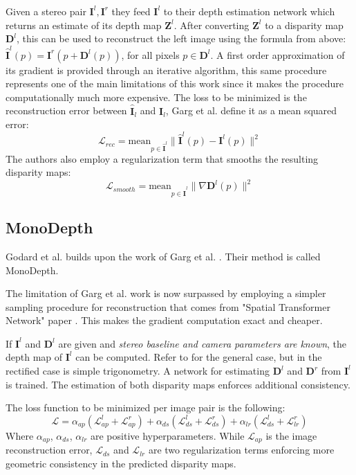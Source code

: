 Given a stereo pair $\mathbf{I}^{l}, \mathbf{I}^{r}$ they feed $\mathbf{I}^{l}$ to their depth estimation network which returns an estimate of its depth map $\mathbf{Z}^{l}$.
After converting $\mathbf{Z}^{l}$ to a disparity map $\mathbf{D}^{l}$, this can be used to reconstruct the left image using the formula from above: $\hat{\mathbf{I}}^{l} (p) = \mathbf{I}^{r} (p + \mathbf{D}^{l}(p))$, for all pixels $p \in \mathbf{D}^{l}$.
A first order approximation of its gradient is provided through an iterative algorithm, this same procedure represents one of the main limitations of this work since it makes the procedure computationally much more expensive.
The loss to be minimized is the reconstruction error between $\hat{\mathbf{I}}_{l}$ and $\mathbf{I}_{l}$, Garg et al. define it as a mean squared error:
\[
	\mathcal{L}_{rec} = \text{mean}_{p \in \hat{\mathbf{I}}^{l}} \big\| \hat{\mathbf{I}}^{l}(p) - \mathbf{I}^{l}(p) \big\|^{2}
\]
The authors also employ a regularization term that smooths the resulting disparity maps:
\[
	\mathcal{L}_{smooth} = \text{mean}_{p \in \hat{\mathbf{I}}^{l}} \big\| \nabla \mathbf{D}^{l} (p) \big\|^{2}
\]

\subsection{MonoDepth}
Godard et al. \cite{MonoDepth} builds upon the work of Garg et al. \cite{Garg}.
Their method is called MonoDepth.

The limitation of Garg et al. work is now surpassed by employing a simpler sampling procedure for reconstruction that comes from "Spatial Transformer Network" paper \cite{STN}.
This makes the gradient computation exact and cheaper.

If $\mathbf{I}^{l}$ and $\mathbf{D}^{l}$ are given and \textit{stereo baseline and camera parameters are known}, the depth map of $\mathbf{I}^{l}$ can be computed.
Refer to \cite{multiview} for the general case, but in the rectified case is simple trigonometry.
A network for estimating $\mathbf{D}^{l}$ and $\mathbf{D}^{r}$ from $\mathbf{I}^{l}$ is trained.
The estimation of both disparity maps enforces additional consistency.

The loss function to be minimized per image pair is the following:
\[
	\mathcal{L} = \alpha_{ap}(\mathcal{L}_{ap}^{l} + \mathcal{L}_{ap}^{r}) +
		\alpha_{ds}(\mathcal{L}_{ds}^{l} + \mathcal{L}_{ds}^{r}) +
		\alpha_{lr}(\mathcal{L}_{ds}^{l} + \mathcal{L}_{lr}^{r}) 
\]
Where $\alpha_{ap}$, $\alpha_{ds}$, $\alpha_{lr}$ are positive hyperparameters.
While $\mathcal{L}_{ap}$ is the image reconstruction error, $\mathcal{L}_{ds}$ and $\mathcal{L}_{lr}$ are two regularization terms enforcing more geometric consistency in the predicted disparity maps.

